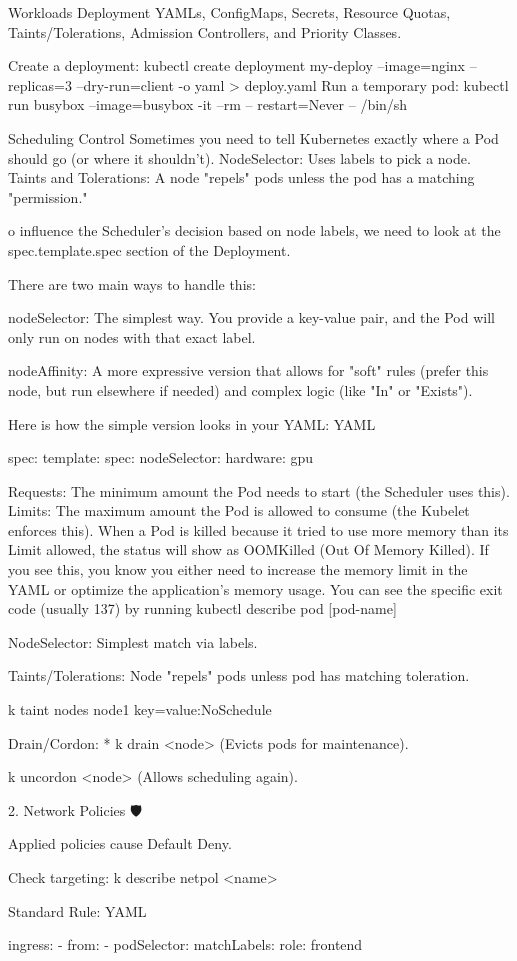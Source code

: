 Workloads	Deployment YAMLs, ConfigMaps, Secrets, Resource Quotas, Taints/Tolerations, Admission Controllers, and Priority Classes.


Create a deployment: kubectl create deployment my-deploy --image=nginx --replicas=3 --dry-run=client -o yaml > deploy.yaml
Run a temporary pod: kubectl run busybox --image=busybox -it --rm -- restart=Never -- /bin/sh

Scheduling Control
Sometimes you need to tell Kubernetes exactly where a Pod should go (or where it shouldn't).
    NodeSelector: Uses labels to pick a node.
    Taints and Tolerations: A node "repels" pods unless the pod has a matching "permission."

o influence the Scheduler's decision based on node labels, we need to look at the spec.template.spec section of the Deployment.

There are two main ways to handle this:

    nodeSelector: The simplest way. You provide a key-value pair, and the Pod will only run on nodes with that exact label.

    nodeAffinity: A more expressive version that allows for "soft" rules (prefer this node, but run elsewhere if needed) and complex logic (like "In" or "Exists").

Here is how the simple version looks in your YAML:
YAML

spec:
  template:
    spec:
      nodeSelector:
        hardware: gpu



   Requests: The minimum amount the Pod needs to start (the Scheduler uses this).
    Limits: The maximum amount the Pod is allowed to consume (the Kubelet enforces this).
When a Pod is killed because it tried to use more memory than its Limit allowed, the status will show as OOMKilled (Out Of Memory Killed).
If you see this, you know you either need to increase the memory limit in the YAML or optimize the application's memory usage. You can see the specific exit code (usually 137) by running kubectl describe pod [pod-name]



   NodeSelector: Simplest match via labels.

    Taints/Tolerations: Node "repels" pods unless pod has matching toleration.

        k taint nodes node1 key=value:NoSchedule

    Drain/Cordon: * k drain <node> (Evicts pods for maintenance).

        k uncordon <node> (Allows scheduling again).

  
2. Network Policies 🛡️

Applied policies cause Default Deny.

    Check targeting: k describe netpol <name>

    Standard Rule:
    YAML

    ingress:
    - from:
      - podSelector:
          matchLabels: {role: frontend}


